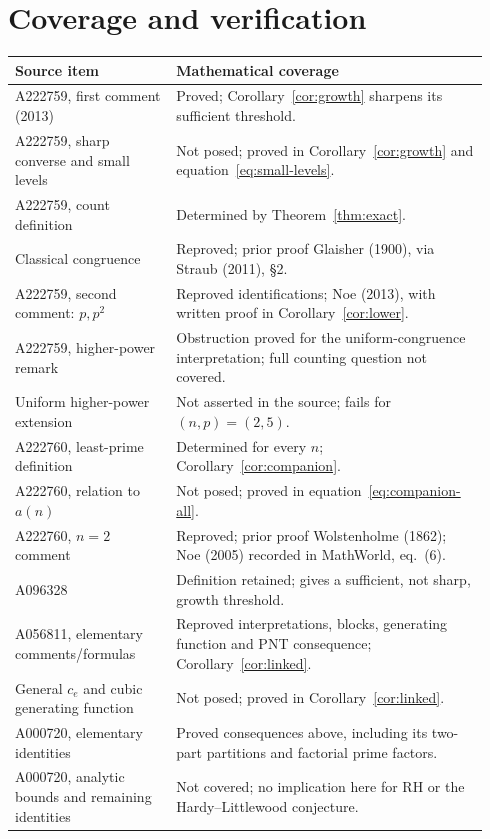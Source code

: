 \documentclass[11pt]{article}
\begin{document}
\section{Coverage and verification}
\begin{center}\small
\begin{tabular}{@{}>{\raggedright\arraybackslash}p{0.32\linewidth}>{\raggedright\arraybackslash}p{0.62\linewidth}@{}}
\toprule
Source item & Mathematical coverage\\
\midrule
A222759, first comment (2013) & Proved; Corollary~\ref{cor:growth} sharpens its sufficient threshold.\\
A222759, sharp converse and small levels & Not posed; proved in Corollary~\ref{cor:growth} and equation~\eqref{eq:small-levels}.\\
A222759, count definition & Determined by Theorem~\ref{thm:exact}.\\
Classical congruence & Reproved; prior proof Glaisher (1900), via Straub (2011), \S2.\\
A222759, second comment: $p,p^2$ & Reproved identifications; Noe (2013), with written proof in Corollary~\ref{cor:lower}.\\
A222759, higher-power remark & Obstruction proved for the uniform-congruence interpretation; full counting question not covered.\\
Uniform higher-power extension & Not asserted in the source; fails for $(n,p)=(2,5)$.\\
A222760, least-prime definition & Determined for every $n$; Corollary~\ref{cor:companion}.\\
A222760, relation to $a(n)$ & Not posed; proved in equation~\eqref{eq:companion-all}.\\
A222760, $n=2$ comment & Reproved; prior proof Wolstenholme (1862); Noe (2005) recorded in MathWorld, eq.~(6).\\
A096328 & Definition retained; gives a sufficient, not sharp, growth threshold.\\
A056811, elementary comments/formulas & Reproved interpretations, blocks, generating function and PNT consequence; Corollary~\ref{cor:linked}.\\
General $c_e$ and cubic generating function & Not posed; proved in Corollary~\ref{cor:linked}.\\
A000720, elementary identities & Proved consequences above, including its two-part partitions and factorial prime factors.\\
A000720, analytic bounds and remaining identities & Not covered; no implication here for RH or the Hardy--Littlewood conjecture.\\
\bottomrule
\end{tabular}
\end{center}
\end{document}
